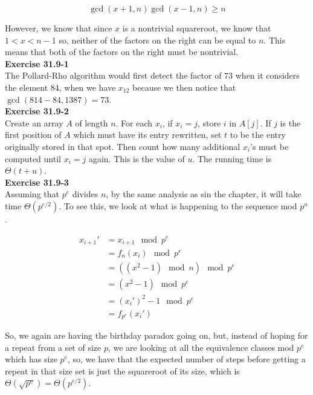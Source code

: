 \documentclass{article}
\begin{document}
\[
\gcd(x+1,n)\gcd(x-1,n) \ge n
\]

However, we know that since $x$ is a nontrivial squareroot, we know that $1 < x < n-1$ so, neither of the factors on the right can be equal to $n$. This means that both of the factors on the right must be nontrivial.\\



\noindent\textbf{Exercise 31.9-1}\\

The Pollard-Rho algorithm would first detect the factor of $73$ when it considers the element $84$, when we have $x_{12}$ because we then notice that $\gcd(814-84,1387) = 73$.\\

\noindent\textbf{Exercise 31.9-2}\\ 

Create an array $A$ of length $n$.  For each $x_i$, if $x_i = j$, store $i$ in $A[j]$.  If $j$ is the first position of $A$ which must have its entry rewritten, set $t$ to be the entry originally stored in that spot.  Then count how many additional $x_i$'s must be computed until $x_i = j$ again. This is the value of $u$.  The running time is $\Theta(t+u)$. \\

\noindent\textbf{Exercise 31.9-3}\\

Assuming that $p^e$ divides $n$, by the same analysis as sin the chapter, it will take time $\Theta(p^{e/2})$. To see this, we look at what is happening to the sequence mod $p^n$.

\begin{align*}
x_{i+1}' &= x_{i+1} \mod p^e\\
& = f_n(x_i) \mod p^e\\
&=((x^2-1)\mod n)\mod p^e\\
&=(x^2-1)\mod p^e\\
&= (x_i')^2-1 \mod p^e\\
&=f_{p^e}(x_i')
\end{align*}

So, we again are having the birthday paradox going on, but, instead of hoping for a repeat from a set of size $p$, we are looking at all the equivalence classes mod $p^e$ which has size $p^e$, so, we have that the expected number of steps before getting a repeat in that size set is just the squareroot of its size, which is $\Theta(\sqrt{p^{e}}) =\Theta(p^{e/2})$. \\
\end{document}
